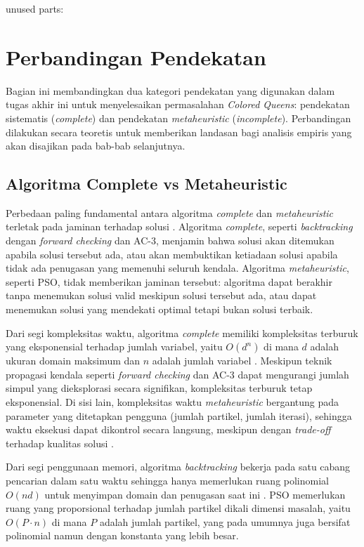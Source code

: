 unused parts:

\section{Perbandingan Pendekatan}
\label{sec:perbandingan}

Bagian ini membandingkan dua kategori pendekatan yang digunakan dalam tugas akhir ini untuk menyelesaikan permasalahan \textit{Colored Queens}: pendekatan sistematis (\textit{complete}) dan pendekatan \textit{metaheuristic} (\textit{incomplete}). Perbandingan dilakukan secara teoretis untuk memberikan landasan bagi analisis empiris yang akan disajikan pada bab-bab selanjutnya.

\subsection{Algoritma Complete vs Metaheuristic}
\label{subsec:perbandingan-complete-meta}

Perbedaan paling fundamental antara algoritma \textit{complete} dan \textit{metaheuristic} terletak pada jaminan terhadap solusi \cite{russell2020artificial}. Algoritma \textit{complete}, seperti \textit{backtracking} dengan \textit{forward checking} dan AC-3, menjamin bahwa solusi akan ditemukan apabila solusi tersebut ada, atau akan membuktikan ketiadaan solusi apabila tidak ada penugasan yang memenuhi seluruh kendala. Algoritma \textit{metaheuristic}, seperti PSO, tidak memberikan jaminan tersebut: algoritma dapat berakhir tanpa menemukan solusi valid meskipun solusi tersebut ada, atau dapat menemukan solusi yang mendekati optimal tetapi bukan solusi terbaik.

Dari segi kompleksitas waktu, algoritma \textit{complete} memiliki kompleksitas terburuk yang eksponensial terhadap jumlah variabel, yaitu $O(d^n)$ di mana $d$ adalah ukuran domain maksimum dan $n$ adalah jumlah variabel \cite{kumar1998}. Meskipun teknik propagasi kendala seperti \textit{forward checking} dan AC-3 dapat mengurangi jumlah simpul yang dieksplorasi secara signifikan, kompleksitas terburuk tetap eksponensial. Di sisi lain, kompleksitas waktu \textit{metaheuristic} bergantung pada parameter yang ditetapkan pengguna (jumlah partikel, jumlah iterasi), sehingga waktu eksekusi dapat dikontrol secara langsung, meskipun dengan \textit{trade-off} terhadap kualitas solusi \cite{blum2003metaheuristics}.

Dari segi penggunaan memori, algoritma \textit{backtracking} bekerja pada satu cabang pencarian dalam satu waktu sehingga hanya memerlukan ruang polinomial $O(nd)$ untuk menyimpan domain dan penugasan saat ini \cite{van2006backtracking}. PSO memerlukan ruang yang proporsional terhadap jumlah partikel dikali dimensi masalah, yaitu $O(P \cdot n)$ di mana $P$ adalah jumlah partikel, yang pada umumnya juga bersifat polinomial namun dengan konstanta yang lebih besar.

